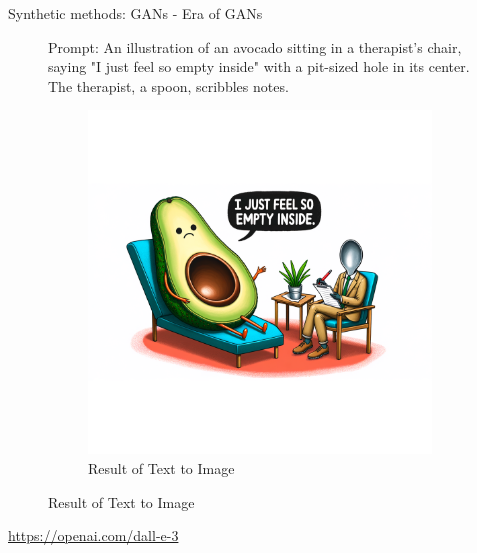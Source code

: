 \documentclass[
	aspectratio = 169
 ]{beamer}
\begin{document}
\begin{frame}{Synthetic methods: GANs - Era of GANs}

	\begin{figure}[h]
		\begin{minipage}{.45\textwidth}
		  Prompt: \newline
		  An illustration of an avocado sitting in a therapist's chair, saying "I just feel so empty inside" with a pit-sized hole in its center. The therapist, a spoon, scribbles notes.
		\end{minipage}
		\begin{minipage}{.45\textwidth}
			\begin{figure}[h]
			\centering
			\includegraphics[width=\textwidth]{gallery/avocado-square.png}
			\vspace*{-20mm}
			\caption{Result of Text to Image}
			\end{figure}
		\end{minipage}
	\end{figure}
	\tiny{\url{https://openai.com/dall-e-3}}
 
\end{frame}
\end{document}
